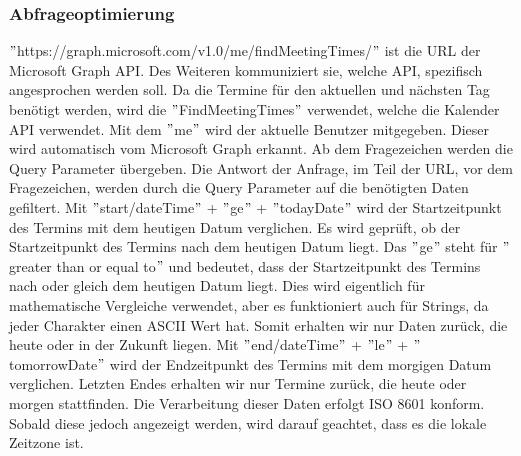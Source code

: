 \subsubsection{Abfrageoptimierung}\label{subsubsec:abfrageoptimierung}
\("\)https://graph.microsoft.com/v1.0/me/findMeetingTimes/\("\) ist die URL der Microsoft Graph API.
Des Weiteren kommuniziert sie, welche API, spezifisch angesprochen werden soll.
Da die Termine für den aktuellen und nächsten Tag benötigt werden, wird die \("\)FindMeetingTimes\("\) verwendet, welche die Kalender API verwendet.
Mit dem \("\)me\("\) wird der aktuelle Benutzer mitgegeben.
Dieser wird automatisch vom Microsoft Graph erkannt.
Ab dem Fragezeichen werden die Query Parameter übergeben.
Die Antwort der Anfrage, im Teil der URL, vor dem Fragezeichen, werden durch die Query Parameter auf die benötigten Daten gefiltert.
\newline
Mit \("\)start/dateTime\("\) + \("\)ge\("\) + \("\){todayDate}\("\) wird der Startzeitpunkt des Termins mit dem heutigen Datum verglichen.
Es wird geprüft, ob der Startzeitpunkt des Termins nach dem heutigen Datum liegt.
Das \("\)ge\("\) steht für \("\)greater than or equal to\("\) und bedeutet, dass der Startzeitpunkt des Termins nach oder gleich dem heutigen Datum liegt.
Dies wird eigentlich für mathematische Vergleiche verwendet, aber es funktioniert auch für Strings, da jeder Charakter einen ASCII Wert hat.
\newline
Somit erhalten wir nur Daten zurück, die heute oder in der Zukunft liegen.
\newline
Mit \("\)end/dateTime\("\) + \("\)le\("\) + \("\) {tomorrowDate}\("\) wird der Endzeitpunkt des Termins mit dem morgigen Datum verglichen.
Letzten Endes erhalten wir nur Termine zurück, die heute oder morgen stattfinden.
Die Verarbeitung dieser Daten erfolgt ISO 8601 konform.
Sobald diese jedoch angezeigt werden, wird darauf geachtet, dass es die lokale Zeitzone ist.
\newline
